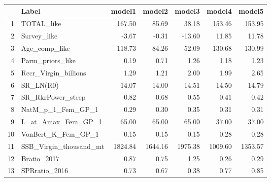 \begin{table}[ht]
\centering
\begin{tabular}{rlrrrrr}
  \hline
 & Label & model1 & model2 & model3 & model4 & model5 \\ 
  \hline
1 & TOTAL\_like & 167.50 & 85.69 & 38.18 & 153.46 & 153.95 \\ 
  2 & Survey\_like & -3.67 & -0.31 & -13.60 & 11.85 & 11.78 \\ 
  3 & Age\_comp\_like & 118.73 & 84.26 & 52.09 & 130.68 & 130.99 \\ 
  4 & Parm\_priors\_like & 0.19 & 0.71 & 1.26 & 1.18 & 1.23 \\ 
  5 & Recr\_Virgin\_billions & 1.29 & 1.21 & 2.00 & 1.99 & 2.65 \\ 
  6 & SR\_LN(R0) & 14.07 & 14.00 & 14.51 & 14.50 & 14.79 \\ 
  7 & SR\_RkrPower\_steep & 0.82 & 0.68 & 0.55 & 0.41 & 0.42 \\ 
  8 & NatM\_p\_1\_Fem\_GP\_1 & 0.29 & 0.30 & 0.35 & 0.31 & 0.31 \\ 
  9 & L\_at\_Amax\_Fem\_GP\_1 & 65.00 & 65.00 & 65.00 & 37.00 & 37.00 \\ 
  10 & VonBert\_K\_Fem\_GP\_1 & 0.15 & 0.15 & 0.15 & 0.28 & 0.28 \\ 
  11 & SSB\_Virgin\_thousand\_mt & 1824.84 & 1644.16 & 1975.38 & 1009.60 & 1353.57 \\ 
  12 & Bratio\_2017 & 0.87 & 0.75 & 1.25 & 0.26 & 0.29 \\ 
  13 & SPRratio\_2016 & 0.73 & 0.67 & 0.38 & 0.77 & 0.85 \\ 
   \hline
\end{tabular}
\end{table}
